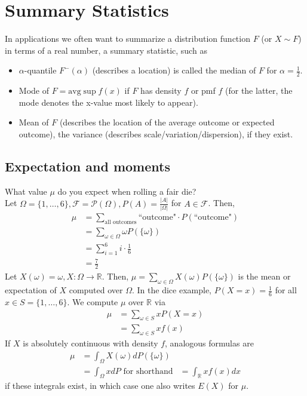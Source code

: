 \documentclass{article}
\newcommand{\R}{\mathbb{R}}
\begin{document}
	\section{Summary Statistics}
	In applications we often want to summarize a distribution function $F$ (or $X\sim F$) in terms of a real number, a summary statistic, such as
	\begin{itemize}
		\item $\alpha$-quantile $F^-(\alpha)$ (describes a location) is called the median of $F$ for $\alpha=\frac{1}{2}$.
		
		\item Mode of $F=\mbox{avg}\sup f(x)$ if $F$ has density $f$ or pmf $f$ (for the latter, the mode denotes the x-value most likely to appear).
		
		\item Mean of $F$ (describes the location of the average outcome or expected outcome), the variance (describes scale/variation/dispersion), if they exist.
	\end{itemize}
	
	\subsection{Expectation and moments}
	What value $\mu$ do you expect when rolling a fair die?\\
	
	Let $\Omega=\{1, \dots, 6\}, \mathcal{F}=\mathcal{P}(\Omega), P(A)=\frac{|A|}{|\Omega|}$ for $A\in\mathcal{F}$. Then, 
	\begin{align*}
		 \mu&=\sum_{\mbox{all outcomes}}\mbox{``outcome"}\cdot P(\mbox{``outcome"})\\
		 &=\sum_{\omega\in\Omega}\omega P(\{\omega\})\\
		 &=\sum_{i=1}^6i\cdot\frac{1}{6}\\
		 &=\frac{7}{2}
	\end{align*}
	Let $X(\omega)=\omega, X : \Omega\to\R$. Then, $\mu=\sum_{\omega\in\Omega}X(\omega)P(\{\omega\})$ is the mean or expectation of $X$ computed over $\Omega$. In the dice example, $P(X=x)=\frac{1}{6}$ for all $x\in S=\{1, \dots, 6\}$. We compute $\mu$ over $\R$ via
	\begin{align*}
		\mu&=\sum_{\omega\in S}xP(X=x)\\
		&=\sum_{\omega\in S}xf(x)
	\end{align*}
	If $X$ is absolutely continuous with density $f$, analogous formulas are
	\begin{align*}
		\mu&=\int_{\Omega}X(\omega)dP(\{\omega\})\\
		&=\int_{\Omega}xdP\mbox{ for shorthand}
		&=\int_{\R}xf(x)dx
	\end{align*}
	if these integrals exist, in which case one also writes $E(X)$ for $\mu$.\\
	
\end{document}
